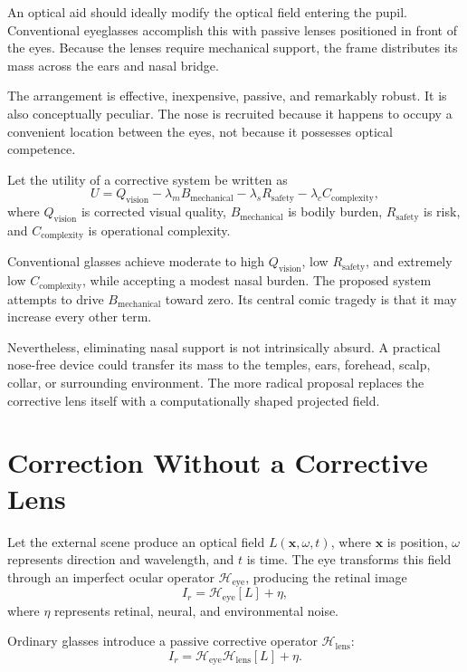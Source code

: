 \documentclass[11pt]{article}
\begin{document}
An optical aid should ideally modify the optical field entering the pupil. Conventional eyeglasses accomplish this with passive lenses positioned in front of the eyes. Because the lenses require mechanical support, the frame distributes its mass across the ears and nasal bridge.

The arrangement is effective, inexpensive, passive, and remarkably robust. It is also conceptually peculiar. The nose is recruited because it happens to occupy a convenient location between the eyes, not because it possesses optical competence.

Let the utility of a corrective system be written as
\[
U=Q_{\mathrm{vision}}-\lambda_m B_{\mathrm{mechanical}}
-\lambda_s R_{\mathrm{safety}}
-\lambda_c C_{\mathrm{complexity}},
\]
where $Q_{\mathrm{vision}}$ is corrected visual quality, $B_{\mathrm{mechanical}}$ is bodily burden, $R_{\mathrm{safety}}$ is risk, and $C_{\mathrm{complexity}}$ is operational complexity.

Conventional glasses achieve moderate to high $Q_{\mathrm{vision}}$, low $R_{\mathrm{safety}}$, and extremely low $C_{\mathrm{complexity}}$, while accepting a modest nasal burden. The proposed system attempts to drive $B_{\mathrm{mechanical}}$ toward zero. Its central comic tragedy is that it may increase every other term.

Nevertheless, eliminating nasal support is not intrinsically absurd. A practical nose-free device could transfer its mass to the temples, ears, forehead, scalp, collar, or surrounding environment. The more radical proposal replaces the corrective lens itself with a computationally shaped projected field.

\section{Correction Without a Corrective Lens}

Let the external scene produce an optical field $L(\mathbf{x},\omega,t)$, where $\mathbf{x}$ is position, $\omega$ represents direction and wavelength, and $t$ is time. The eye transforms this field through an imperfect ocular operator $\mathcal{H}_{\mathrm{eye}}$, producing the retinal image
\[
I_r=\mathcal{H}_{\mathrm{eye}}[L]+\eta,
\]
where $\eta$ represents retinal, neural, and environmental noise.

Ordinary glasses introduce a passive corrective operator $\mathcal{H}_{\mathrm{lens}}$:
\[
I_r=\mathcal{H}_{\mathrm{eye}}\mathcal{H}_{\mathrm{lens}}[L]+\eta.
\]
\end{document}
